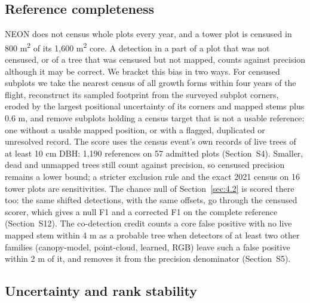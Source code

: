 \documentclass[preprint,12pt,authoryear,a4paper]{elsarticle}
\begin{document}
\subsection{Reference completeness}\label{sec:4.3}

NEON does not census whole plots every year, and a tower plot is censused in 800
m\textsuperscript{2} of its 1,600 m\textsuperscript{2} core. A detection in a part of a plot that was not censused,
or of a tree that was censused but not mapped, counts against precision although
it may be correct. We bracket this bias in two ways. For censused subplots we
take the nearest census of all growth forms within four years of the flight,
reconstruct its sampled footprint from the surveyed subplot corners, eroded by
the largest positional uncertainty of its corners and mapped stems plus 0.6 m,
and remove subplots holding a census target that is not a usable reference: one
without a usable mapped position, or with a flagged, duplicated or unresolved
record. The score uses the census event's own records of live trees of at least
10 cm DBH: 1,190 references on 57 admitted plots (Section~S4). Smaller, dead and
unmapped trees still count against precision, so censused precision remains a
lower bound; a stricter exclusion rule and the exact 2021 census on 16 tower
plots are sensitivities. The chance null of Section~\ref{sec:4.2} is scored there too: the
same shifted detections, with the same offsets, go through the censused scorer,
which gives a null F1 and a corrected F1 on the complete reference (Section~S12). The co-detection credit counts a core false positive with no live mapped
stem within 4 m as a probable tree when detectors of at least two other families
(canopy-model, point-cloud, learned, RGB) leave such a false positive within 2 m
of it, and removes it from the precision denominator (Section~S5).

\subsection{Uncertainty and rank stability}\label{sec:4.4}
\end{document}
